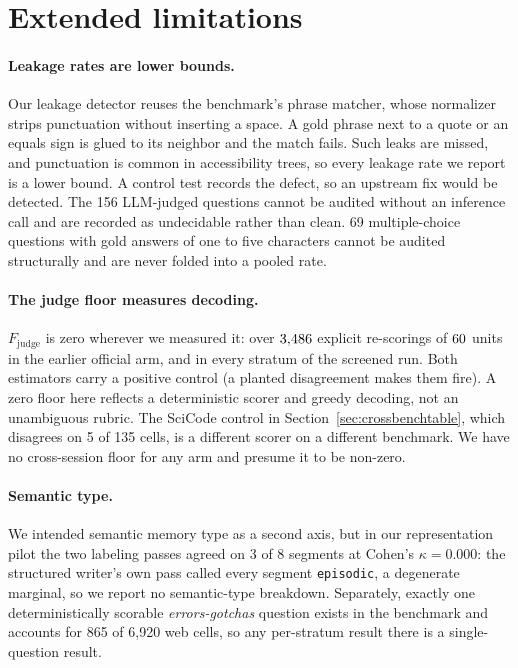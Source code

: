 \section{Extended limitations}
\label{sec:extlimits}

\paragraph{Leakage rates are lower bounds.}
Our leakage detector reuses the benchmark's phrase matcher, whose normalizer
strips punctuation without inserting a space. A gold phrase next to a quote
or an equals sign is glued to its neighbor and the match fails. Such leaks
are missed, and punctuation is common in accessibility trees, so every
leakage rate we report is a lower bound. A control test records the defect, so
an upstream fix would be detected. The 156
LLM-judged questions cannot be audited without an inference call and are
recorded as undecidable rather than clean. 69 multiple-choice questions with
gold answers of one to five characters cannot be audited structurally and are
never folded into a pooled rate.

\paragraph{The judge floor measures decoding.}
$F_{\mathrm{judge}}$ is zero wherever we measured it: over $3{,}486$
explicit re-scorings of $60$ units in the earlier official arm, and
in every stratum of the screened run. Both estimators carry a positive control
(a planted disagreement makes them fire). A zero floor here reflects a
deterministic scorer and greedy decoding, not an unambiguous rubric. The
SciCode control in Section~\ref{sec:crossbenchtable}, which disagrees on 5 of
135 cells, is a different scorer on a different benchmark. We have no
cross-session floor for any arm and presume it to be non-zero.

\paragraph{Semantic type.}
We intended semantic memory type as a second axis, but in our representation
pilot the two labeling passes agreed on 3 of 8 segments at Cohen's
$\kappa = 0.000$: the structured writer's own pass called every segment
\texttt{episodic}, a degenerate marginal, so we report no semantic-type
breakdown. Separately, exactly one deterministically scorable
\emph{errors-gotchas} question exists in the benchmark and accounts for 865 of
6{,}920 web cells, so any per-stratum result there is a single-question result.

